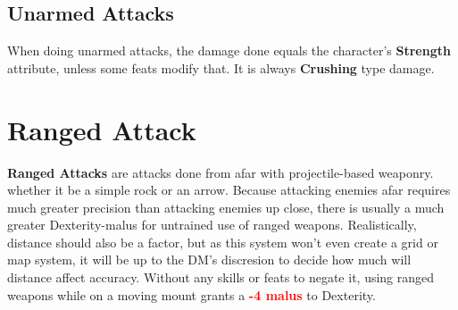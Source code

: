 \documentclass[tikz,openany,11pt,a4paper]{book}
\newcommand{\Malus}[1]{\textcolor{red}{\textbf{-{#1} malus}}}
\begin{document}
\subsection{Unarmed Attacks}
When doing unarmed attacks, the damage done equals the character's \textbf{Strength} attribute, unless some feats modify that. It is always \textbf{Crushing} type damage.
\section{Ranged Attack}
\textbf{Ranged Attacks} are attacks done from afar with projectile-based weaponry. whether it be a simple rock or an arrow. Because attacking enemies afar requires much greater precision than attacking enemies up close, there is usually a much greater Dexterity-malus for untrained use of ranged weapons. Realistically, distance should also be a factor, but as this system won't even create a grid or map system, it will be up to the DM's discresion to decide how much will distance affect accuracy.\newline
Without any skills or feats to negate it, using ranged weapons while on a moving mount grants a \Malus{4} to Dexterity.
\end{document}
